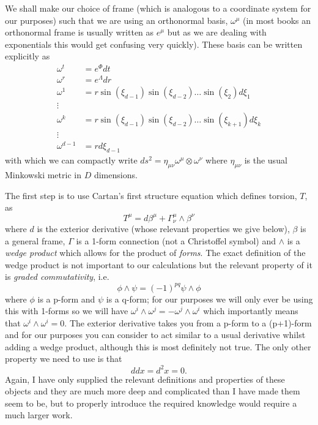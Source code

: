 \documentclass[12pt]{article}
\numberwithin{equation}{section}
\numberwithin{figure}{section}
\begin{document}
We shall make our choice of frame (which is analogous to a coordinate system for our purposes) such that we are using an orthonormal basis, ${\omega^\mu}$ (in most books an orthonormal frame is usually written as ${e^\mu}$ but as we are dealing with exponentials this would get confusing very quickly). These basis can be written explicitly as
\begin{align}
\omega^{t} &= e^{\Phi}dt 	\\
\omega^{r} &= e^{\Lambda}dr 	\\
\omega^{1} &= r \sin(\xi_{d-1})\sin(\xi_{d-2})\dots\sin(\xi_2) d\xi_1 	\\
\vdots 	\\
\omega^{k} &= r\sin(\xi_{d-1})\sin(\xi_{d-2})\dots \sin(\xi_{k+1})d\xi_k\\
\vdots \\
\omega^{d-1} &= r d\xi_{d-1}
\end{align}
with which we can compactly write $ds^2=\eta_{\mu\nu}\omega^\mu\otimes\omega^\nu$ where $\eta_{\mu\nu}$ is the usual Minkowski metric in $D$ dimensions.

The first step is to use Cartan's first structure equation which defines torsion, $T$, as
\begin{equation}
	T^{\mu}=d\beta^{\mu}+\Gamma^{\mu}_{\nu} \wedge \beta^{\nu} \label{eq:torsion}
\end{equation}
where $d$ is the exterior derivative (whose relevant properties we give below), $\beta$ is a general frame, $\Gamma$ is a 1-form connection (not a Christoffel symbol) and $\wedge$ is a \emph{wedge product} which allows for the product of \emph{forms}. The exact definition of the wedge product is not important to our calculations but the relevant property of it is \emph{graded commutativity}, i.e.
\begin{equation}
	\phi\wedge\psi=(-1)^{pq}\psi\wedge\phi
\end{equation}
where $\phi$ is a p-form and $\psi$ is a q-form; for our purposes we will only ever be using this with 1-forms so we will have $\omega^i\wedge\omega^{j}=-\omega^{j}\wedge\omega^{i}$ which importantly means that $\omega^i\wedge\omega^{i}=0$. The exterior derivative takes you from a p-form to a (p+1)-form and for our purposes you can consider to act similar to a usual derivative whilst adding a wedge product, although this is most definitely not true. The only other property we need to use is that 
\begin{equation}
	ddx=d^2x=0.
\end{equation}
Again, I have only supplied the relevant definitions and properties of these objects and they are much more deep and complicated than I have made them seem to be, but to properly introduce the required knowledge would require a much larger work. 
\end{document}
